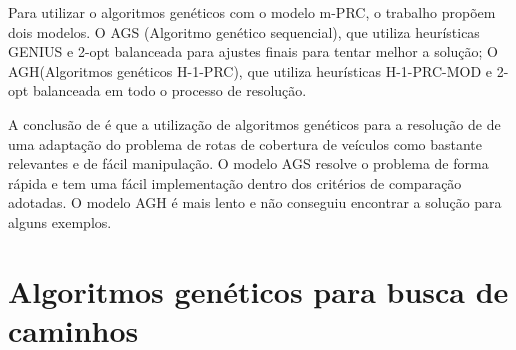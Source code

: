 Para utilizar o algoritmos genéticos com o modelo m-PRC, o trabalho propõem dois modelos. O AGS (Algoritmo genético sequencial), que utiliza heurísticas GENIUS e 2-opt balanceada para ajustes finais para tentar melhor a solução; O AGH(Algoritmos genéticos H-1-PRC), que utiliza heurísticas H-1-PRC-MOD e 2-opt balanceada em todo o processo de resolução.

A conclusão de \cite{Washington} é que a utilização de algoritmos genéticos para a resolução de de uma adaptação do problema de rotas de cobertura de veículos como bastante relevantes e de fácil manipulação. O modelo AGS resolve o problema de forma rápida e tem uma fácil implementação dentro dos critérios de comparação adotadas. O modelo AGH é mais lento e não conseguiu encontrar a solução para alguns exemplos.

\section{Algoritmos genéticos para busca de caminhos}

